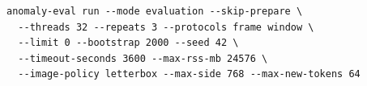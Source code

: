 \begin{verbatim}
anomaly-eval run --mode evaluation --skip-prepare \
  --threads 32 --repeats 3 --protocols frame window \
  --limit 0 --bootstrap 2000 --seed 42 \
  --timeout-seconds 3600 --max-rss-mb 24576 \
  --image-policy letterbox --max-side 768 --max-new-tokens 64
\end{verbatim}
